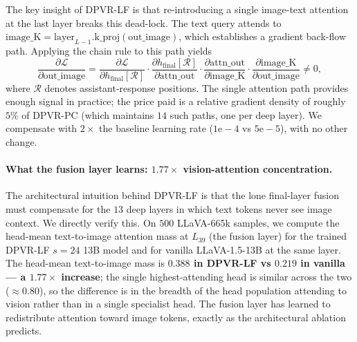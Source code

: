 \documentclass[a4paper,fleqn,review]{cas-sc}
\newcommand{\dpvrlf}{DPVR-LF}
\newcommand{\dpvrpc}{DPVR-PC}
\begin{document}
The key insight of \dpvrlf{} is that re-introducing a single image-text
attention at the last layer breaks this dead-lock. The text query
attends to $\mathrm{image\_K} =
\mathrm{layer}_{L-1}.\mathrm{k\_proj}(\mathrm{out\_image})$,
which establishes a gradient back-flow path. Applying the chain rule
to this path yields
\begin{equation}
\frac{\partial \mathcal{L}}{\partial \mathrm{out\_image}}
= \frac{\partial \mathcal{L}}{\partial h_{\mathrm{final}}[\mathcal{R}]}
   \cdot \frac{\partial h_{\mathrm{final}}[\mathcal{R}]}{\partial \mathrm{attn\_out}}
   \cdot \frac{\partial \mathrm{attn\_out}}{\partial \mathrm{image\_K}}
   \cdot \frac{\partial \mathrm{image\_K}}{\partial \mathrm{out\_image}}
   \neq 0,
\label{eq:gradflow}
\end{equation}
where $\mathcal{R}$ denotes assistant-response positions. The single
attention path provides enough signal in practice; the price paid is
a relative gradient density of roughly $5\%$ of \dpvrpc{} (which
maintains $14$ such paths, one per deep layer). We compensate with
$2\times$ the baseline learning rate ($1\mathrm{e}{-}4$ vs
$5\mathrm{e}{-}5$), with no other change.

\paragraph{What the fusion layer learns: $1.77\times$ vision-attention
concentration.} The architectural intuition behind \dpvrlf{} is that
the lone final-layer fusion must compensate for the $13$ deep layers
in which text tokens never see image context. We directly verify
this. On $500$ LLaVA-665k samples, we compute the head-mean
text-to-image attention mass at $L_{39}$ (the fusion layer) for the
trained \dpvrlf{} $s = 24$ 13B model and for vanilla LLaVA-1.5-13B at
the same layer. The head-mean text-to-image mass is \textbf{$0.388$
in \dpvrlf{} vs $0.219$ in vanilla — a $1.77\times$ increase}; the
single highest-attending head is similar across the two
($\approx 0.80$), so the difference is in the breadth of the head
population attending to vision rather than in a single specialist
head. The fusion layer has learned to redistribute attention toward
image tokens, exactly as the architectural ablation predicts.
\end{document}
